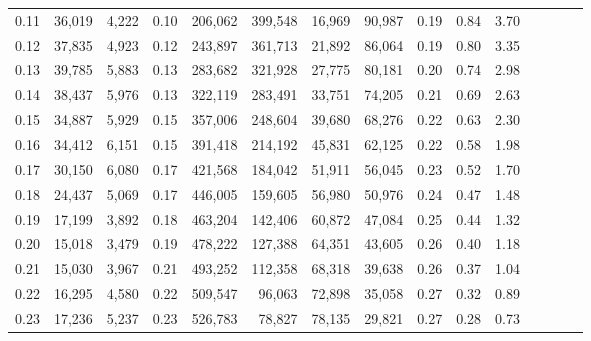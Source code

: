 \begin{tabular}{rrrcrrrrrrrrrrr}
0.11 &  36,019 &  4,222 &                                       0.10 &  206,062 &  399,548 &   16,969 &   90,987 &  0.19 &  0.84 &                         3.70 \\
0.12 &  37,835 &  4,923 &                                       0.12 &  243,897 &  361,713 &   21,892 &   86,064 &  0.19 &  0.80 &                         3.35 \\
0.13 &  39,785 &  5,883 &                                       0.13 &  283,682 &  321,928 &   27,775 &   80,181 &  0.20 &  0.74 &                         2.98 \\
0.14 &  38,437 &  5,976 &                                       0.13 &  322,119 &  283,491 &   33,751 &   74,205 &  0.21 &  0.69 &                         2.63 \\
0.15 &  34,887 &  5,929 &                                       0.15 &  357,006 &  248,604 &   39,680 &   68,276 &  0.22 &  0.63 &                         2.30 \\
0.16 &  34,412 &  6,151 &                                       0.15 &  391,418 &  214,192 &   45,831 &   62,125 &  0.22 &  0.58 &                         1.98 \\
0.17 &  30,150 &  6,080 &                                       0.17 &  421,568 &  184,042 &   51,911 &   56,045 &  0.23 &  0.52 &                         1.70 \\
0.18 &  24,437 &  5,069 &                                       0.17 &  446,005 &  159,605 &   56,980 &   50,976 &  0.24 &  0.47 &                         1.48 \\
0.19 &  17,199 &  3,892 &                                       0.18 &  463,204 &  142,406 &   60,872 &   47,084 &  0.25 &  0.44 &                         1.32 \\
0.20 &  15,018 &  3,479 &                                       0.19 &  478,222 &  127,388 &   64,351 &   43,605 &  0.26 &  0.40 &                         1.18 \\
0.21 &  15,030 &  3,967 &                                       0.21 &  493,252 &  112,358 &   68,318 &   39,638 &  0.26 &  0.37 &                         1.04 \\
0.22 &  16,295 &  4,580 &                                       0.22 &  509,547 &   96,063 &   72,898 &   35,058 &  0.27 &  0.32 &                         0.89 \\
0.23 &  17,236 &  5,237 &                                       0.23 &  526,783 &   78,827 &   78,135 &   29,821 &  0.27 &  0.28 &                         0.73 \\

\end{tabular}
